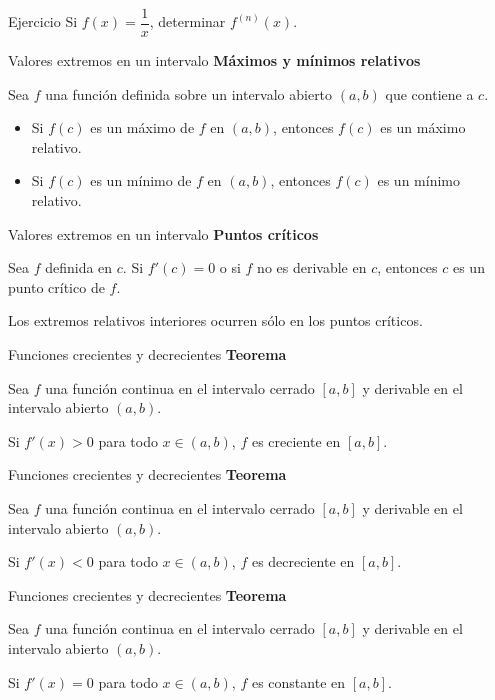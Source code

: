 \documentclass[main.tex]{subfiles}
\begin{document}
\begin{frame}{Ejercicio}
Si $f(x)=\dfrac1x$, determinar $f^{(n)}(x)$.
\end{frame}
\begin{frame}{Valores extremos en un intervalo}
\textbf{Máximos y mínimos relativos}\par\medskip
Sea $f$ una función definida sobre un intervalo abierto $(a,b)$ que contiene a $c$.
\begin{itemize}
\item Si $f(c)$ es un máximo de $f$ en $(a,b)$, entonces $f(c)$ es un máximo relativo.
\item Si $f(c)$ es un mínimo de $f$ en $(a,b)$, entonces $f(c)$ es un mínimo relativo.
\end{itemize}
\end{frame}
\begin{frame}{Valores extremos en un intervalo}
\textbf{Puntos críticos}\par\medskip
Sea $f$ definida en $c$. Si $f'(c)=0$ o si $f$ no es derivable en $c$, entonces $c$ es un punto crítico de $f$.
\medskip

Los extremos relativos interiores ocurren sólo en los puntos críticos.
\end{frame}
\begin{frame}{Funciones crecientes y decrecientes}
\textbf{Teorema}\par Sea $f$ una función continua en el intervalo cerrado $[a,b]$ y derivable en el intervalo abierto $(a,b)$.\medskip

Si $f'(x)>0$ para todo $x\in(a,b)$, $f$ es creciente en $[a,b]$.
\end{frame}
\begin{frame}{Funciones crecientes y decrecientes}
\textbf{Teorema}\par Sea $f$ una función continua en el intervalo cerrado $[a,b]$ y derivable en el intervalo abierto $(a,b)$.\medskip

Si $f'(x)<0$ para todo $x\in(a,b)$, $f$ es decreciente en $[a,b]$.
\end{frame}
\begin{frame}{Funciones crecientes y decrecientes}
\textbf{Teorema}\par Sea $f$ una función continua en el intervalo cerrado $[a,b]$ y derivable en el intervalo abierto $(a,b)$.\medskip

Si $f'(x)=0$ para todo $x\in(a,b)$, $f$ es constante en $[a,b]$.
\end{frame}
\end{document}
